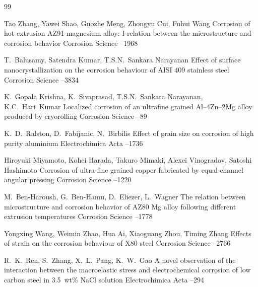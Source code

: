 \newpage

\begin{thebibliography}{99}

\by Tao Zhang,  Yawei Shao, Guozhe
Meng, Zhongyu Cui, Fuhui Wang
\paper  Corrosion of hot extrusion AZ91 magnesium alloy: I-relation between the microstructure and corrosion behavior
\jour Corrosion Science
--1968

\by T.~Balusamy, Satendra Kumar, T.S.N.~Sankara Narayanan 
\paper Effect of surface nanocrystallization on the corrosion behaviour of AISI 409 stainless steel  \jour Corrosion Science
--3834

\by     K.~Gopala Krishna, K.~Sivaprasad, T.S.N.~Sankara Narayanan, K.C.~Hari~Kumar
\paper Localized corrosion of an ultrafine grained Al--4Zn--2Mg alloy produced by cryorolling
\jour Corrosion Science
--89

\by K.~D.~Ralston,  D.~Fabijanic,  N.~Birbilis
\paper Effect of grain size on corrosion of high purity aluminium
\jour Electrochimica Acta
--1736

\by Hiroyuki Miyamoto, Kohei Harada, Takuro Mimaki, Alexei Vinogradov, Satoshi Hashimoto
\paper Corrosion of ultra-fine grained copper fabricated by equal-channel angular pressing
\jour Corrosion Science
--1220

\by M.~Ben-Haroush, G.~Ben-Hamu,  D.~Eliezer,  L.~Wagner
\paper The relation between microstructure and corrosion behavior of AZ80 Mg alloy following different extrusion temperatures
\jour Corrosion Science
--1778

\by Yongxing Wang, Weimin Zhao, Hua Ai, Xiaoguang Zhou, Timing Zhang
\paper  Effects of strain on the corrosion behaviour of X80 steel
\jour Corrosion Science
--2766

\by R.~K.~Ren, S.~Zhang, X.~L.~Pang, K.~W.~Gao
\paper A novel observation of the interaction between the macroelastic stress and electrochemical corrosion of low carbon steel in 3.5~wt{\%} NaCl solution
\jour Electrochimica Acta
--294


\end{thebibliography}
